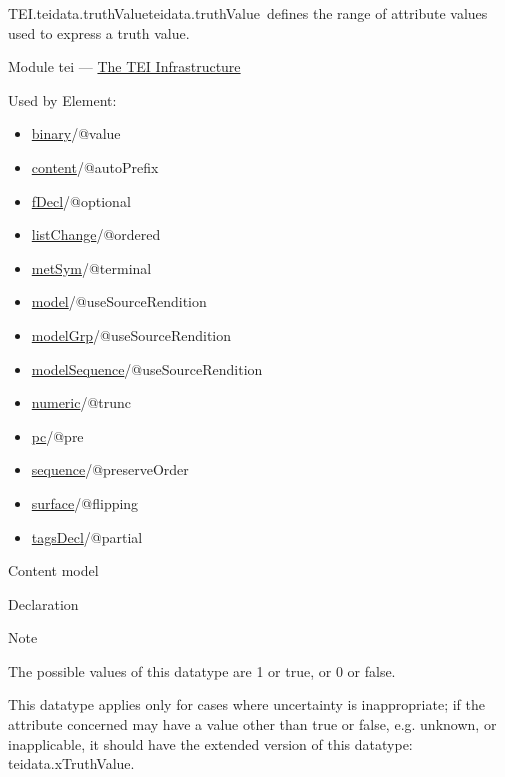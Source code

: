 \begin{reflist}
\item[]\begin{specHead}{TEI.teidata.truthValue}{teidata.truthValue} defines the range of attribute values used to express a truth value.\end{specHead} 
    \item[{Module}]
  tei — \hyperref[ST]{The TEI Infrastructure}
    \item[{Used by}]
  Element: \begin{itemize}
\item \hyperref[TEI.binary]{binary}/@value
\item \hyperref[TEI.content]{content}/@autoPrefix
\item \hyperref[TEI.fDecl]{fDecl}/@optional
\item \hyperref[TEI.listChange]{listChange}/@ordered
\item \hyperref[TEI.metSym]{metSym}/@terminal
\item \hyperref[TEI.model]{model}/@useSourceRendition
\item \hyperref[TEI.modelGrp]{modelGrp}/@useSourceRendition
\item \hyperref[TEI.modelSequence]{modelSequence}/@useSourceRendition
\item \hyperref[TEI.numeric]{numeric}/@trunc
\item \hyperref[TEI.pc]{pc}/@pre
\item \hyperref[TEI.sequence]{sequence}/@preserveOrder
\item \hyperref[TEI.surface]{surface}/@flipping
\item \hyperref[TEI.tagsDecl]{tagsDecl}/@partial
\end{itemize} 
    \item[{Content model}]
    \item[{Declaration}]
    \item[{Note}]
  \par
The possible values of this datatype are 1 or true, or 0 or false.\par
This datatype applies only for cases where uncertainty is inappropriate; if the attribute concerned may have a value other than true or false, e.g. unknown, or inapplicable, it should have the extended version of this datatype: \textsf{teidata.xTruthValue}.
\end{reflist}  
